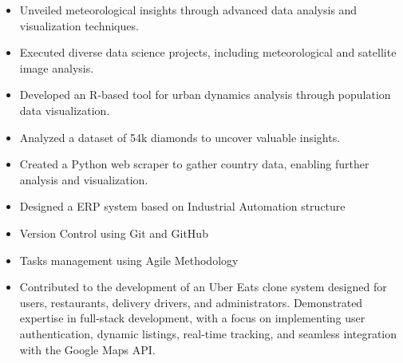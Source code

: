 \documentclass[10pt,a4paper,ragged2e,withhyper]{altacv}
\begin{document}
\begin{paracol}{2}



\begin{itemize}

\item Unveiled meteorological insights through advanced data analysis and visualization techniques.
\item Executed diverse data science projects, including meteorological and satellite image analysis.
\item Developed an R-based tool for urban dynamics analysis through population data visualization.
\item Analyzed a dataset of 54k diamonds to uncover valuable insights.
\item Created a Python web scraper to gather country data, enabling further analysis and visualization.

\end{itemize}

\divider


\begin{itemize}

\item Designed a ERP system based on Industrial Automation structure
\item Version Control using Git and GitHub
\item Tasks management using Agile Methodology


\end{itemize}




\begin{itemize}
\item Contributed to the development of an Uber Eats clone system designed for users, restaurants, delivery drivers, and administrators. Demonstrated expertise in full-stack development, with a focus on implementing user authentication, dynamic listings, real-time tracking, and seamless integration with the Google Maps API.
\end{itemize}
\divider


\end{paracol}
\end{document}
